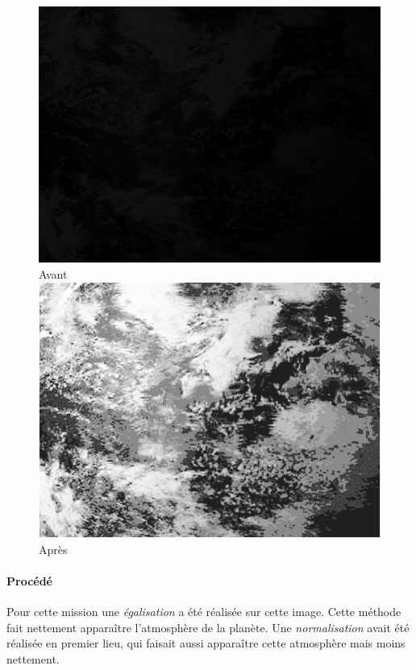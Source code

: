 \documentclass[12pt]{article}
\begin{document}
	\begin{figure}[h]
	\centering
		\begin{multicols}{2}
		\includegraphics[scale=0.525]{images/Gliese667Cc.png}
		Avant
		\includegraphics[scale=0.525]{images/Gliese667CcAFTER.png}
		Après
		\end{multicols}
	\end{figure}
	\vspace{-0.9cm}

		\paragraph{Procédé}	
			Pour cette mission une \emph{égalisation} a été réalisée sur cette image. Cette méthode fait nettement apparaître l'atmosphère de la planète. Une \emph{normalisation} avait été réalisée en premier lieu, qui faisait aussi apparaître cette atmosphère mais moins nettement.
		
\end{document}
